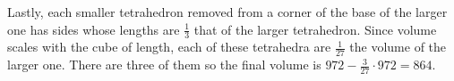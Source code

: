 \begin{enumerate}
 Lastly, each smaller tetrahedron removed from a corner of the base of the larger one has sides whose lengths are $\frac{1}{3}$ that of the larger tetrahedron. Since volume scales with the cube of length, each of these tetrahedra are $\frac{1}{27}$ the volume of the larger one. There are three of them so the final volume is $972 - \frac{3}{27}\cdot972 = 864$.

 


\end{enumerate}